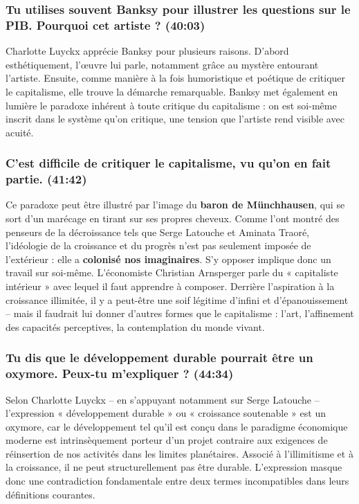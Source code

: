 \subsubsection{Tu utilises souvent Banksy pour illustrer les questions sur le PIB. Pourquoi cet artiste ? \textnormal{\small(40:03)}}

Charlotte Luyckx apprécie Banksy pour plusieurs raisons. D'abord esthétiquement, l'œuvre lui parle, notamment grâce au mystère entourant l'artiste. Ensuite, comme manière à la fois humoristique et poétique de critiquer le capitalisme, elle trouve la démarche remarquable. Banksy met également en lumière le paradoxe inhérent à toute critique du capitalisme : on est soi-même inscrit dans le système qu'on critique, une tension que l'artiste rend visible avec acuité.

\subsubsection{C'est difficile de critiquer le capitalisme, vu qu'on en fait partie. \textnormal{\small(41:42)}}

Ce paradoxe peut être illustré par l'image du \textbf{baron de Münchhausen}, qui se sort d'un marécage en tirant sur ses propres cheveux. Comme l'ont montré des penseurs de la décroissance tels que Serge Latouche et Aminata Traoré, l'idéologie de la croissance et du progrès n'est pas seulement imposée de l'extérieur : elle a \textbf{colonisé nos imaginaires}. S'y opposer implique donc un travail sur soi-même. L'économiste Christian Arnsperger parle du « capitaliste intérieur » avec lequel il faut apprendre à composer. Derrière l'aspiration à la croissance illimitée, il y a peut-être une soif légitime d'infini et d'épanouissement -- mais il faudrait lui donner d'autres formes que le capitalisme : l'art, l'affinement des capacités perceptives, la contemplation du monde vivant.

\subsubsection{Tu dis que le développement durable pourrait être un oxymore. Peux-tu m'expliquer ? \textnormal{\small(44:34)}}

Selon Charlotte Luyckx -- en s'appuyant notamment sur Serge Latouche -- l'expression « développement durable » ou « croissance soutenable » est un oxymore, car le développement tel qu'il est conçu dans le paradigme économique moderne est intrinsèquement porteur d'un projet contraire aux exigences de réinsertion de nos activités dans les limites planétaires. Associé à l'illimitisme et à la croissance, il ne peut structurellement pas être durable. L'expression masque donc une contradiction fondamentale entre deux termes incompatibles dans leurs définitions courantes.

